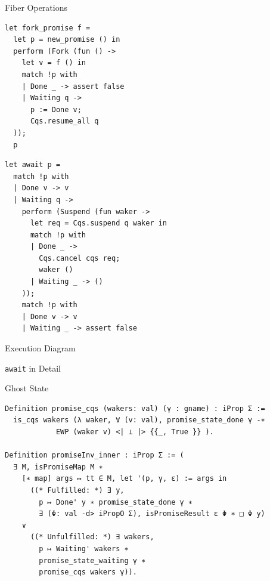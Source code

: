 \documentclass[aspectratio=43]{beamer}
\newcommand{\ocaml}[1]{\texttt{#1}}
\begin{document}
\begin{frame}[fragile]{Fiber Operations}
    \begin{adjustwidth}{-2em}{0em}
        \begin{minipage}{0.45\textwidth}
            \begin{verbatim}
let fork_promise f =
  let p = new_promise () in
  perform (Fork (fun () ->
    let v = f () in
    match !p with
    | Done _ -> assert false
    | Waiting q -> 
      p := Done v;
      Cqs.resume_all q
  ));
  p
\end{verbatim}
        \end{minipage}
        \begin{minipage}{0.5\textwidth}
            \begin{verbatim}
let await p =
  match !p with
  | Done v -> v
  | Waiting q ->
    perform (Suspend (fun waker ->
      let req = Cqs.suspend q waker in
      match !p with
      | Done _ -> 
        Cqs.cancel cqs req; 
        waker ()
      | Waiting _ -> ()
    ));
    match !p with
    | Done v -> v
    | Waiting _ -> assert false
\end{verbatim}
        \end{minipage}

    \end{adjustwidth}
\end{frame}

\begin{frame}{Execution Diagram}
\end{frame}

\begin{frame}[fragile]{\ocaml{await} in Detail}
\end{frame}

\begin{frame}[fragile]{Ghost State}
    \begin{verbatim}
Definition promise_cqs (wakers: val) (γ : gname) : iProp Σ :=
  is_cqs wakers (λ waker, ∀ (v: val), promise_state_done γ -∗
            EWP (waker v) <| ⊥ |> {{_, True }} ).
  
Definition promiseInv_inner : iProp Σ := (
  ∃ M, isPromiseMap M ∗ 
    [∗ map] args ↦ tt ∈ M, let '(p, γ, ε) := args in
      ((* Fulfilled: *) ∃ y,
        p ↦ Done' y ∗ promise_state_done γ ∗ 
        ∃ (Φ: val -d> iPropO Σ), isPromiseResult ε Φ ∗ □ Φ y)
    ∨
      ((* Unfulfilled: *) ∃ wakers,
        p ↦ Waiting' wakers ∗
        promise_state_waiting γ ∗
        promise_cqs wakers γ)).
\end{verbatim}
\end{frame}
\end{document}
